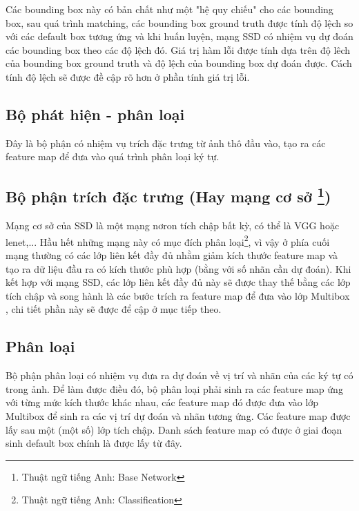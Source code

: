 \documentclass[a4paper,12pt]{article}
\begin{document}
	Các bounding box này có bản chất như một "hệ quy chiếu" cho các bounding box, sau quá trình matching, các bounding box ground truth được tính độ lệch so với các default box tương ứng và khi huấn luyện, mạng SSD\cite{liu2016ssd} có nhiệm vụ dự đoán các bounding box theo các độ lệch đó. Giá trị hàm lỗi được tính dựa trên độ lêch của bounding box ground truth và độ lệch của bounding box dự đoán được. Cách tính độ lệch sẽ được đề cập rõ hơn ở phần tính giá trị lỗi.
	
	
	\subsection{Bộ phát hiện - phân loại}
	Đây là bộ phận có nhiệm vụ trích đặc trưng từ ảnh thô đầu vào, tạo ra các feature map để đưa vào quá trình phân loại ký tự.
	
	\subsection*{Bộ phận trích đặc trưng (Hay mạng cơ sở \footnote{Thuật ngữ tiếng Anh: Base Network})}
	
	Mạng cơ sở của SSD\cite{liu2016ssd} là một mạng nơron tích chập bất kỳ, có thể là VGG\cite{Simonyan14c} hoặc lenet\cite{yanlecun},... Hầu hết những mạng này có mục đích phân loại\footnote{Thuật ngữ tiếng Anh: Classification}, vì vậy ở phía cuối mạng thường có các lớp liên kết đầy đủ nhằm giảm kích thước feature map và tạo ra dữ liệu đầu ra có kích thước phù hợp (bằng với số nhãn cần dự đoán). Khi kết hợp với mạng SSD\cite{liu2016ssd}, các lớp liên kết đầy đủ này sẽ được thay thế bằng các lớp tích chập và song hành là các bước trích ra feature map để đưa vào lớp Multibox \cite{erhan2014scalable}, chi tiết phần này sẽ được để cập ở mục tiếp theo.
	
	\subsection* {Phân loại}
	
	Bộ phận phân loại có nhiệm vụ đưa ra dự đoán về vị trí và nhãn của các ký tự có trong ảnh. Để làm được điều đó, bộ phân loại phải sinh ra các feature map ứng với từng mức kích thước khác nhau, các feature map đó được đưa vào lớp Multibox để sinh ra các vị trí dự đoán và nhãn tương ứng. Các feature map được lấy sau một (một số) lớp tích chập. Danh sách feature map có được ở giai đoạn sinh default box chính là được lấy từ đây. \\
	
\end{document}
